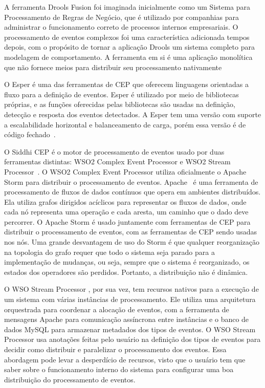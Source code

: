 A ferramenta Drools Fusion foi imaginada inicialmente como um Sistema para Processamento de Regras de Negócio, que é utilizado por companhias para administrar o funcionamento correto de processos internos empresariais. O processamento de eventos complexos foi uma característica adicionada tempos depois, com o propósito de tornar a aplicação Drools um sistema completo para modelagem de comportamento. A ferramenta em si é uma aplicação monolítica que não fornece meios para distribuir seu processamento nativamente~\citep{DroolsFusion} %

O Esper é uma das ferramentas de CEP que oferecem linguagens orientadas a fluxo para a definição de eventos. Esper é utilizado por meio de bibliotecas próprias, e as funções oferecidas pelas bibliotecas são usadas na definição, detecção e resposta dos eventos detectados. A Esper tem uma versão com suporte a escalabilidade horizontal e balanceamento de carga, porém essa versão é de código fechado~\citep{ESPERMatrix}.

O Siddhi CEP é o motor de processamento de eventos usado
por duas ferramentas distintas: WSO2 Complex Event Processor e WSO2 Stream Processor~\citep{WSO2vsSiddhi}.
O WSO2 Complex Event Processor \citep{WSO2CEP} utiliza oficialmente o Apache Storm para distribuir o processamento de eventos. Apache~\cite{Storm} é uma ferramenta de processamento de fluxos de dados contínuos que opera em ambientes distribuídos. Ela utiliza grafos dirigidos acíclicos para representar os fluxos de dados, onde cada nó representa uma operação e cada aresta, um caminho que o dado deve percorrer. O Apache Storm é usado juntamente com ferramentas de CEP para distribuir o processamento de eventos, com as ferramentas de CEP sendo usadas nos nós. Uma grande desvantagem de uso do Storm é que qualquer reorganização na topologia do grafo requer que todo o sistema seja parado para a implementação de mudanças, ou seja, sempre que o sistema é reorganizado, os estados dos operadores são perdidos. Portanto, a distribuição não é dinâmica.

O WSO Stream Processor \citep{WSO2SP}, por sua vez, tem recursos nativos para a execução de um sistema com várias instâncias de processamento. Ele utiliza uma arquitetura orquestrada para coordenar a alocação de eventos, com a ferramenta de mensagens Apache \cite{Kafka} para comunicação assíncrona entre instâncias e o banco de dados MySQL para armazenar metadados dos tipos de eventos. O WSO Stream Processor usa anotações feitas pelo usuário na definição dos tipos de eventos para decidir como distribuir e paralelizar o processamento dos eventos. Essa abordagem pode levar a desperdício de recursos, visto que o usuário tem que saber sobre o funcionamento interno do sistema para configurar uma boa distribuição do processamento de eventos.



